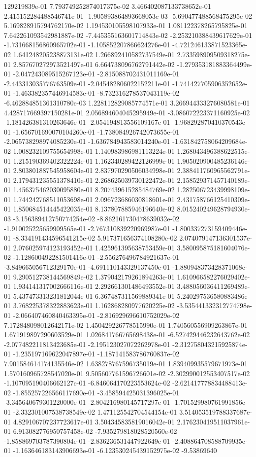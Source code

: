 129219839e-01	7.793749252874017375e-02	3.466402087133738652e-01	2.415152284488546741e-01	-1.905893864893668053e-03	-5.690477488568475295e-02	5.169828915794762170e-02	1.194530105598107933e-01	1.081122378265795825e-01	7.642261093542981887e-02	-7.445355163601714843e-02	-2.253210388439617629e-01	-1.731668156860965702e-01	-1.105852207866624276e-01	-4.721246133871523365e-02	1.641248205238873131e-02	1.266892410582737549e-01	2.733598909509318275e-01	2.857670272973521497e-01	6.664738096762791442e-02	-1.279353181883364499e-01	-2.047243089515267123e-01	-2.815088702431011169e-01	-2.443313035776763509e-01	-2.045482806022152211e-01	-1.741427705906352652e-01	-1.463382357446914583e-01	-8.732316278537043119e-02	-6.462884851361310780e-03	1.228112829085774571e-01	3.266944333276080581e-01	4.428717669397150281e-01	2.056894604045295949e-01	-3.086072223371160925e-02	-1.181426381310263646e-01	-2.054194813556109167e-01	-1.968292870410370543e-01	-1.656701690070104260e-01	-1.738084926742073655e-01	-2.065738298974085230e-01	-1.636784943583014240e-01	-1.631842758064209684e-02	1.008232109755654998e-01	1.140983986981113224e-01	1.268043496388622515e-01	1.215190369402322224e-01	1.162340289422126999e-01	1.905020900485236146e-01	2.803801887545958604e-01	2.837970290506034998e-01	2.388411760965562791e-01	2.179431235551378410e-01	2.268625039730122472e-01	2.158529371457140189e-01	1.456375462030095880e-01	8.207439615285484769e-02	1.282506723439998109e-01	1.744242768511053698e-01	2.096723686030818601e-01	2.431758766125410309e-01	1.850684514445422035e-01	8.137807885946196640e-02	8.015240249628794930e-03	-3.156389412750774254e-02	-8.862161730478639032e-02	-1.910025225659909565e-01	-2.767310839220969987e-01	-1.800337273159409446e-01	-8.334191434596541215e-02	5.917371656374108280e-02	2.074079147136301537e-01	2.076025974123193452e-01	1.425961395638753459e-01	3.580095875181604076e-02	-1.128600492281501416e-01	-2.556276496784921637e-01	-3.849665056712329170e-01	-4.691110143329137450e-01	-1.880948373428371068e-01	9.290512738144569849e-02	1.379042179261894263e-01	1.610966582276029402e-01	1.934141317002666116e-01	2.292661301486493552e-01	3.488056036411269489e-01	5.437473313231812044e-01	6.367487311569889341e-01	5.240297536580883486e-01	3.768225378322883623e-01	1.162868280977620225e-02	-3.535441332312774798e-01	-2.066407460840463395e-01	-2.816929696610752029e-02	7.172848098012642171e-02	1.450429226778515990e-01	1.740560556909263867e-01	1.671919897290603529e-01	1.026841766765698438e-01	-6.527429446232643762e-02	-2.077482211813423685e-01	-2.195123027072262978e-01	-2.312758043215925874e-01	-1.235197169622047897e-01	-1.187141583786760837e-02	7.901584614174135546e-02	1.638278767596735019e-01	1.839409935579671973e-01	1.570160965728547020e-01	9.505607761596726601e-02	-2.302990012553407517e-02	-1.107095190406662127e-01	-6.846064170223553624e-02	-2.621417778834488413e-02	-1.855257226566117690e-01	-3.458594425031396025e-01	-3.345640679301220000e-01	-2.804216980145717297e-01	-1.701529980761991856e-01	-2.332301007538738549e-02	1.471125542704544154e-01	3.514053519788337687e-01	4.829106707237723617e-01	3.504345835819016042e-01	2.176230419511037961e-01	6.913082776950757458e-02	-7.935279818028520560e-02	-1.858869703787390804e-01	-2.836236531447922649e-01	-2.408864708588709935e-01	-1.163646183143906693e-01	-6.123530245439152975e-02	-9.53869640